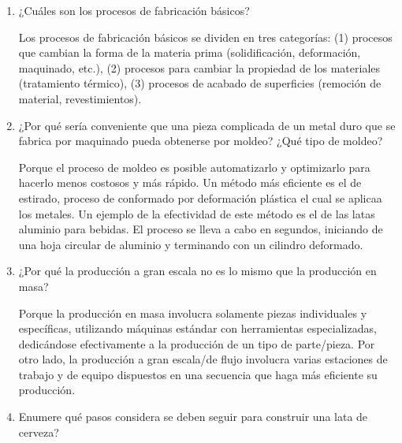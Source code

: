 \documentclass[12pt, letterpaper]{article}
\begin{document}
\begin{enumerate}
	\item ¿Cuáles son los procesos de fabricación básicos?

		Los procesos de fabricación básicos se dividen en tres categorías: (1) procesos que cambian la forma de la materia prima (solidificación, deformación, maquinado, etc.), (2) procesos para cambiar la propiedad de los materiales (tratamiento térmico), (3) procesos de acabado de superficies (remoción de material, revestimientos).\autocite{groover10}

	\item ¿Por qué sería conveniente que una pieza complicada de un metal duro que se fabrica por maquinado pueda obtenerse por moldeo? ¿Qué tipo de moldeo?

		Porque el proceso de moldeo es posible automatizarlo y optimizarlo para hacerlo menos costosos y más rápido. Un método más eficiente es el de estirado, proceso de conformado por deformación plástica el cual se aplicaa los metales. Un ejemplo de la efectividad de este método es el de las latas aluminio para bebidas. El proceso se lleva a cabo en segundos, iniciando de una hoja circular de aluminio y terminando con un cilindro deformado. \autocite{engguy15}

	\item ¿Por qué la producción a gran escala no es lo mismo que la producción en masa?

		Porque la producción en masa involucra solamente piezas individuales y específicas, utilizando máquinas estándar con herramientas especializadas, dedicándose efectivamente a la producción de un tipo de parte/pieza. Por otro lado, la producción a gran escala/de flujo involucra varias estaciones de trabajo y de equipo dispuestos en una secuencia que haga más eficiente su producción. \autocite{groover10}

	\item Enumere qué pasos considera se deben seguir para construir una lata de cerveza?


\end{enumerate}
\end{document}
